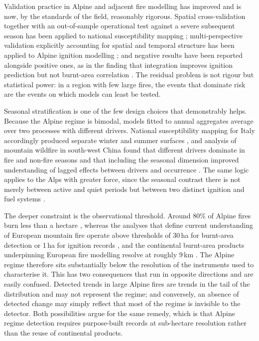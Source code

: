 \documentclass[11pt,a4paper]{article}
\begin{document}
Validation practice in Alpine and adjacent fire modelling has improved and is now, by the standards of the field, reasonably rigorous. Spatial cross-validation together with an out-of-sample operational test against a severe subsequent season has been applied to national susceptibility mapping \citep{trucchia_defining_2022}; multi-perspective validation explicitly accounting for spatial and temporal structure has been applied to Alpine ignition modelling \citep{moreno_1_nodate}; and negative results have been reported alongside positive ones, as in the finding that integration improves ignition prediction but not burnt-area correlation \citep{muller_towards_2020}. The residual problem is not rigour but statistical power: in a region with few large fires, the events that dominate risk are the events on which models can least be tested.

Seasonal stratification is one of the few design choices that demonstrably helps. Because the Alpine regime is bimodal, models fitted to annual aggregates average over two processes with different drivers. National susceptibility mapping for Italy accordingly produced separate winter and summer surfaces \citep{trucchia_defining_2022}, and analysis of mountain wildfire in south-west China found that different drivers dominate in fire and non-fire seasons and that including the seasonal dimension improved understanding of lagged effects between drivers and occurrence \citep{wang_seasonal_2023}. The same logic applies to the Alps with greater force, since the seasonal contrast there is not merely between active and quiet periods but between two distinct ignition and fuel systems \citep{muller_forest_2020, bercak_combination_2024}.

The deeper constraint is the observational threshold. Around 80\% of Alpine fires burn less than a hectare \citep{muller_forest_2020}, whereas the analyses that define current understanding of European mountain fire operate above thresholds of 30\,ha for burnt-area detection \citep{beloiu_climatedriven_2026} or 1\,ha for ignition records \citep{gelabert_assessing_2025}, and the continental burnt-area products underpinning European fire modelling resolve at roughly 9\,km \citep{forrest_understanding_2024}. The Alpine regime therefore sits substantially below the resolution of the instruments used to characterise it. This has two consequences that run in opposite directions and are easily confused. Detected trends in large Alpine fires are trends in the tail of the distribution and may not represent the regime; and conversely, an absence of detected change may simply reflect that most of the regime is invisible to the detector. Both possibilities argue for the same remedy, which is that Alpine regime detection requires purpose-built records at sub-hectare resolution rather than the reuse of continental products.
\end{document}
